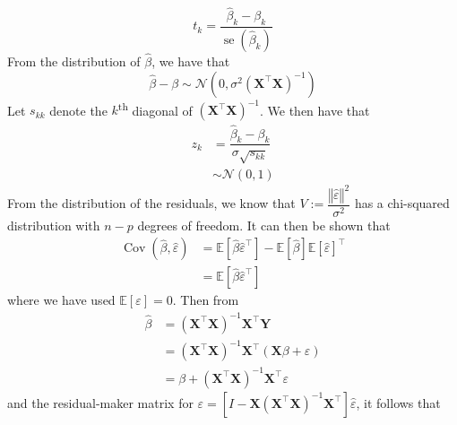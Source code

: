 \documentclass[11pt]{report} %
\begin{document}
\begin{equation}
t_{k} = \dfrac{\hat{\beta}_{k} - \beta_{k}}{\operatorname{se}\left(\hat{\beta}_{k}\right)}
\end{equation}
From the distribution of $\hat{\beta}$, we have that
\begin{equation}
\hat{\beta} - \beta \sim \mathcal{N}\left(0, \sigma^{2}\left(\mathbf{X}^{\top}\mathbf{X}\right)^{-1}\right)
\end{equation}
Let $s_{kk}$ denote the $k$\textsuperscript{th} diagonal of $\left(\mathbf{X}^{\top}\mathbf{X}\right)^{-1}$. We then have that
\begin{align}
z_{k} &= \dfrac{\hat{\beta}_{k} - \beta_{k}}{\sigma \sqrt{s_{kk}}} \\
&\sim \mathcal{N}\left(0, 1\right)
\end{align}
From the distribution of the residuals, we know that $V := \dfrac{\left\Vert \hat{\varepsilon}\right\Vert^{2}}{\sigma^{2}}$ has a chi-squared distribution with $n - p$ degrees of freedom. It can then be shown that
\begin{align}
\operatorname{Cov}\left(\hat{\beta}, \hat{\varepsilon}\right) &= \mathbb{E}\left[\hat{\beta}\hat{\varepsilon}^{\top}\right]-\mathbb{E}\left[\hat{\beta}\right]\mathbb{E}\left[\hat{\varepsilon}\right]^{\top} \\
&= \mathbb{E}\left[\hat{\beta}\hat{\varepsilon}^{\top}\right]
\end{align}
where we have used $\mathbb{E}\left[\varepsilon\right] = 0$. Then from
\begin{align}
\hat{\beta} &= \left(\mathbf{X}^{\top}\mathbf{X}\right)^{-1}\mathbf{X}^{\top}\mathbf{Y} \\
&= \left(\mathbf{X}^{\top}\mathbf{X}\right)^{-1}\mathbf{X}^{\top}\left(\mathbf{X}\beta + \varepsilon\right) \\
&= \beta + \left(\mathbf{X}^{\top}\mathbf{X}\right)^{-1}\mathbf{X}^{\top}\varepsilon
\end{align}
and the residual-maker matrix for $\varepsilon = \left[I-\mathbf{X}\left(\mathbf{X}^{\top}\mathbf{X}\right)^{-1}\mathbf{X}^{\top}\right]\hat{\varepsilon}$, it follows that
\end{document}

